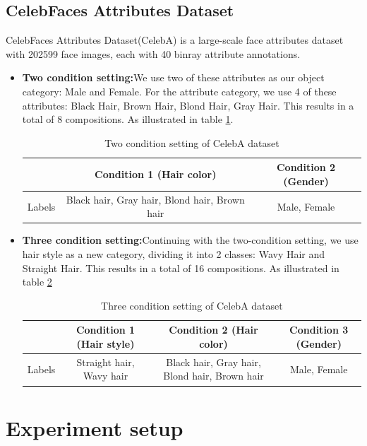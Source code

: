 \subsection{CelebFaces Attributes Dataset}
\label{subsec:celeba}
CelebFaces Attributes Dataset(CelebA) is a large-scale face attributes dataset with 202599 face images, each with 40 binray attribute annotations. 
\begin{itemize}
    \item \textbf{Two condition setting:}We use two of these attributes as our object category: Male and Female. For the attribute category, we use 4 of these attributes: Black Hair, Brown Hair, Blond Hair, Gray Hair. This results in a total of 8 compositions. As illustrated in table \ref{tab:twocondceleba}.
    \begin{table} [H]
        \centering
        \begin{tabular}{c|c|c}
             & Condition 1 (Hair color) & Condition 2 (Gender) \\
             \hline
             Labels & Black hair, Gray hair, Blond hair, Brown hair &  Male, Female \\
        \end{tabular}
        \caption{Two condition setting of CelebA dataset}
        \label{tab:twocondceleba}
    \end{table}
    \item \textbf{Three condition setting:}Continuing with the two-condition setting, we use hair style as a new category, dividing it into 2 classes: Wavy Hair and Straight Hair. This results in a total of 16 compositions. As illustrated in table \ref{tab:threecondceleba}
    
    \begin{table} [H]
        \centering
        \begin{tabular}{c|c|c|c}
             & Condition 1 (Hair style) & Condition 2 (Hair color) & Condition 3 (Gender)\\
             \hline
            Labels & Straight hair, Wavy hair & Black hair, Gray hair, Blond hair, Brown hair &  Male, Female \\
        \end{tabular}
        \caption{Three condition setting of CelebA dataset}
        \label{tab:threecondceleba}
    \end{table}
\end{itemize}



\section{Experiment setup}

